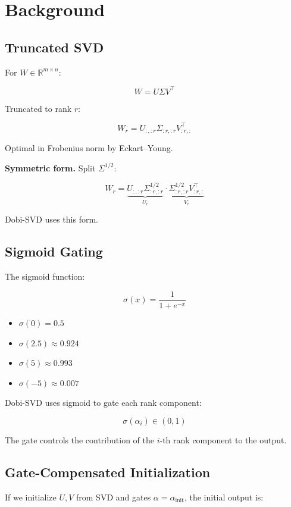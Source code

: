 
\section{Background}

\subsection{Truncated SVD}

For $W \in \mathbb{R}^{m \times n}$:

\[
W = U \Sigma V^\top
\tag{3.1}
\]

Truncated to rank $r$:

\[
W_r = U_{:, :r} \Sigma_{:r, :r} V_{:r, :}^\top
\tag{3.2}
\]

Optimal in Frobenius norm by Eckart--Young.

\textbf{Symmetric form.} Split $\Sigma^{1/2}$:

\[
W_r = \underbrace{U_{:, :r} \Sigma_{:r, :r}^{1/2}}_{U_r} \cdot \underbrace{\Sigma_{:r, :r}^{1/2} V_{:r, :}^\top}_{V_r}
\tag{3.3}
\]

Dobi-SVD uses this form.

\subsection{Sigmoid Gating}

The sigmoid function:

\[
\sigma(x) = \frac{1}{1 + e^{-x}}
\tag{3.4}
\]

\begin{itemize}
\item $\sigma(0) = 0.5$
\item $\sigma(2.5) \approx 0.924$
\item $\sigma(5) \approx 0.993$
\item $\sigma(-5) \approx 0.007$

\end{itemize}
Dobi-SVD uses sigmoid to gate each rank component:

\[
\sigma(\alpha_i) \in (0, 1)
\tag{3.5}
\]

The gate controls the contribution of the $i$-th rank component to the 
output.

\subsection{Gate-Compensated Initialization}

If we initialize $U, V$ from SVD and gates $\alpha = \alpha_\text{init}$, 
the initial output is:

